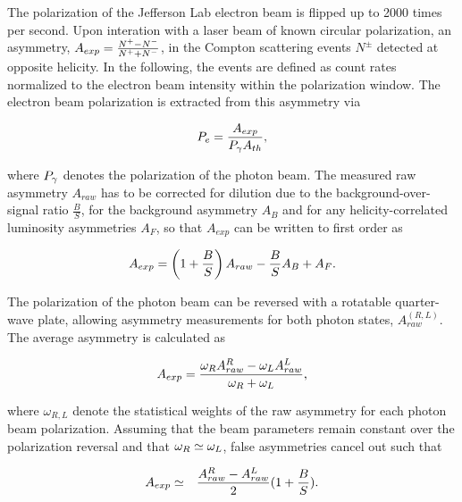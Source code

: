 {The polarization of the Jefferson Lab electron beam is flipped up to 2000 times per second. Upon interation
with a laser beam of known circular polarization,
an asymmetry, $A_{exp} = \frac{N^{+}-N^{-}}{N^{+}+N^{-}}$,
in the Compton scattering events $N^{\pm}$ detected at opposite helicity.
In the following, the events are defined as count rates normalized
to the electron beam intensity within the polarization window.
The electron beam polarization is extracted from this
asymmetry via %

\begin{equation}
\displaystyle
P_{{e}} = \frac{A_{exp}}{P_{\gamma} A_{th}},
\label{eq:compton_def}
\end{equation}

\noindent
where $P_{\gamma}$ denotes the polarization of the photon beam.
The measured raw asymmetry $A_{raw}$
has to be corrected for
dilution due to the background-over-signal ratio $\frac{B}{S}$,
for the background asymmetry $A_B$ and for any helicity-correlated
luminosity asymmetries $A_F$, so that $A_{exp}$ can be
written to first order as

\begin{equation}
\displaystyle
A_{exp} =  \left( 1 + \frac{B}{S} \right) A_{raw} - \frac{B}{S} A_B
+ A_F.
\label{eq:compton_aexp}
\end{equation}

\noindent The polarization of the photon beam can be reversed with a
rotatable quarter-wave plate, allowing asymmetry measurements
for both photon states, $A_{raw}^{(R,L)}$.
The average asymmetry is calculated as

\begin{equation}
\displaystyle
A_{exp}  =  \frac{\omega_R A_{raw}^R - \omega_L A_{raw}^L}{\omega_R + \omega_L},
\label{eq:compton_asyRL}
\end{equation}

\noindent where $\omega_{R,L}$ denote the statistical weights of the
raw asymmetry for each photon beam polarization.
Assuming that the beam parameters remain constant over the
polarization reversal and that
$\omega_R \simeq \omega_L$, false asymmetries cancel out such that



\begin{eqnarray}
\displaystyle
A_{exp} & \simeq & \frac{A_{raw}^R - A_{raw}^L}{2}  (1 + \frac{B}{S}).
\label{eq:compton_adil}
\end{eqnarray}

}
